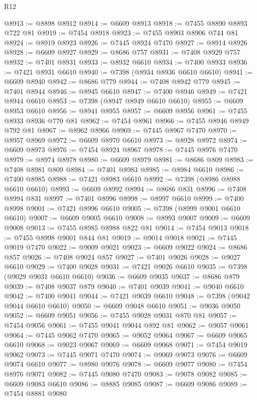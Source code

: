 \begin{lexlean}{R12}
\begin{coremodule}
@8913 := @8898 @8912
@8914 := @6609 @8913
@8918 := @7455 @8890 @8893 @722 @81
@8919 := @7454 @8918
@8923 := @7455 @8903 @8906 @744 @81
@8924 := @8919 @8923
@8926 := @7445 @8924 @7470
@8927 := @8914 @8926
@8928 := @6609 @8927
@8929 := @8686 @757
@8931 := @7408 @8929 @757
@8932 := @7401 @8931
@8933 := @8932 @6610
@8934 := @7400 @8933
@8936 := @7421 @8931 @6610
@8940 := @7398 (@8934 @8936 @6610 @6610)
@8941 := @6609 @8940
@8942 := @8686 @779
@8944 := @7408 @8942 @779
@8945 := @7401 @8944
@8946 := @8945 @6610
@8947 := @7400 @8946
@8949 := @7421 @8944 @6610
@8953 := @7398 (@8947 @8949 @6610 @6610)
@8955 := @6609 @8953 @6610
@8956 := @8941 @8955
@8957 := @6609 @8956
@8961 := @7455 @8933 @8936 @770 @81
@8962 := @7454 @8961
@8966 := @7455 @8946 @8949 @792 @81
@8967 := @8962 @8966
@8969 := @7445 @8967 @7470
@8970 := @8957 @8969
@8972 := @6609 @8970 @6610
@8973 := @8928 @8972
@8974 := @6609 @8973
@8976 := @7454 @8924 @8967
@8978 := @7445 @8976 @7470
@8979 := @8974 @8978
@8980 := @6609 @8979
@8981 := @8686 @809
@8983 := @7408 @8981 @809
@8984 := @7401 @8983
@8985 := @8984 @6610
@8986 := @7400 @8985
@8988 := @7421 @8983 @6610
@8992 := @7398 (@8986 @8988 @6610 @6610)
@8993 := @6609 @8992
@8994 := @8686 @831
@8996 := @7408 @8994 @831
@8997 := @7401 @8996
@8998 := @8997 @6610
@8999 := @7400 @8998
@9001 := @7421 @8996 @6610
@9005 := @7398 (@8999 @9001 @6610 @6610)
@9007 := @6609 @9005 @6610
@9008 := @8993 @9007
@9009 := @6609 @9008
@9013 := @7455 @8985 @8988 @822 @81
@9014 := @7454 @9013
@9018 := @7455 @8998 @9001 @844 @81
@9019 := @9014 @9018
@9021 := @7445 @9019 @7470
@9022 := @9009 @9021
@9023 := @6609 @9022
@9024 := @8686 @857
@9026 := @7408 @9024 @857
@9027 := @7401 @9026
@9028 := @9027 @6610
@9029 := @7400 @9028
@9031 := @7421 @9026 @6610
@9035 := @7398 (@9029 @9031 @6610 @6610)
@9036 := @6609 @9035
@9037 := @8686 @879
@9039 := @7408 @9037 @879
@9040 := @7401 @9039
@9041 := @9040 @6610
@9042 := @7400 @9041
@9044 := @7421 @9039 @6610
@9048 := @7398 (@9042 @9044 @6610 @6610)
@9050 := @6609 @9048 @6610
@9051 := @9036 @9050
@9052 := @6609 @9051
@9056 := @7455 @9028 @9031 @870 @81
@9057 := @7454 @9056
@9061 := @7455 @9041 @9044 @892 @81
@9062 := @9057 @9061
@9064 := @7445 @9062 @7470
@9065 := @9052 @9064
@9067 := @6609 @9065 @6610
@9068 := @9023 @9067
@9069 := @6609 @9068
@9071 := @7454 @9019 @9062
@9073 := @7445 @9071 @7470
@9074 := @9069 @9073
@9076 := @6609 @9074 @6610
@9077 := @8980 @9076
@9078 := @6609 @9077
@9080 := @7454 @8976 @9071
@9082 := @7445 @9080 @7470
@9083 := @9078 @9082
@9085 := @6609 @9083 @6610
@9086 := @8885 @9085
@9087 := @6609 @9086
@9089 := @7454 @8881 @9080

\end{coremodule}
\end{lexlean}

